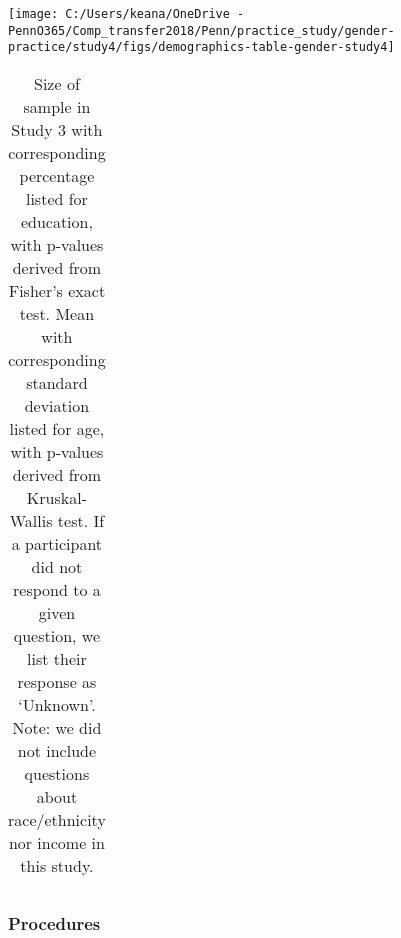 \documentclass[letterpaper, nobind]{templates/ociamthesis}
\begin{document}
\newpage

\begin{center}\texttt{[image: C:/Users/keana/OneDrive - PennO365/Comp\_transfer2018/Penn/practice\_study/gender-practice/study4/figs/demographics-table-gender-study4]} \end{center}

\begin{table}[ht]
\centering
\begingroup\fontsize{0.1pt}{0.1pt}\selectfont
\begin{tabular}{r}
   \\ 
 \end{tabular}
\endgroup
\caption{Size of sample in Study 3 with corresponding percentage listed for education, with p-values derived from Fisher’s exact test. Mean with corresponding standard deviation listed for age, with p-values derived from Kruskal-Wallis test. If a participant did not respond to a given question, we list their response as ‘Unknown’. Note: we did not include questions about race/ethnicity nor income in this study.} 
\label{tab:demographics-table-gender-study4}
\end{table}

\hypertarget{procedures-2}{%
\subsubsection{Procedures}\label{procedures-2}}
\end{document}
